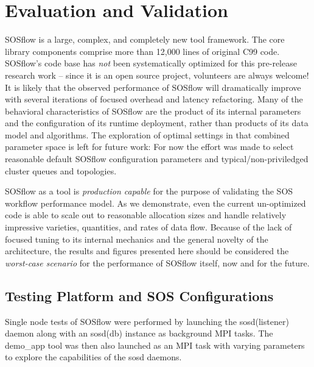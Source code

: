 
\section{Evaluation and Validation}

SOSflow is a large, complex, and completely new tool framework. The
core library components comprise more than 12,000 lines of original
C99 code. SOSflow's code base has \textit{not} been systematically
optimized for this pre-release research work -- since it is an open
source project, volunteers are always welcome! It is likely that the
observed performance of SOSflow will dramatically improve with several
iterations of focused overhead and latency refactoring. Many of the
behavioral characteristics of SOSflow are the product of its internal
parameters and the configuration of its runtime deployment, rather
than products of its data model and algorithms. The exploration of
optimal settings in that combined parameter space is left for future
work: For now the effort was made to select reasonable default SOSflow
configuration parameters and typical/non-priviledged cluster
queues and topologies.

SOSflow as a tool is \textit{production capable} for the purpose of
validating the SOS workflow performance model. As we demonstrate, even
the current un-optimized code is able to scale out to reasonable
allocation sizes and handle relatively impressive varieties,
quantities, and rates of data flow. Because of the lack of focused
tuning to its internal mechanics and the general novelty of the
architecture, the results and figures presented here should be
considered the \textit{worst-case scenario} for the performance of
SOSflow itself, now and for the future.

\subsection{Testing Platform and SOS Configurations}

Single node tests of SOSflow were performed by launching the
sosd(listener) daemon along with an sosd(db) instance as background MPI tasks.
The demo\_app tool was then also launched as an MPI task with varying parameters
to explore the capabilities of the sosd daemons.

